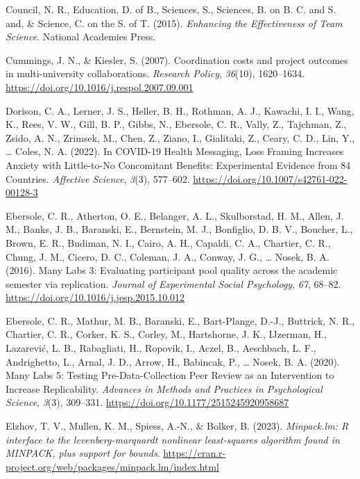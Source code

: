 \documentclass[
  man,floatsintext]{apa7}
\newlength{\cslhangindent}
\newenvironment{CSLReferences}[2] %
 {\begin{list}{}{%
  \setlength{\itemindent}{0pt}
  \setlength{\leftmargin}{0pt}
  \setlength{\parsep}{0pt}
  \ifodd #1
   \setlength{\leftmargin}{\cslhangindent}
   \setlength{\itemindent}{-1\cslhangindent}
  \fi
  \setlength{\itemsep}{#2\baselineskip}}}
 {\end{list}}
\begin{document}
\begin{CSLReferences}{1}{0}
Council, N. R., Education, D. of B., Sciences, S., Sciences, B. on B. C. and S. and, \& Science, C. on the S. of T. (2015). \emph{Enhancing the Effectiveness of Team Science}. National Academies Press.

Cummings, J. N., \& Kiesler, S. (2007). Coordination costs and project outcomes in multi-university collaborations. \emph{Research Policy}, \emph{36}(10), 1620--1634. \url{https://doi.org/10.1016/j.respol.2007.09.001}

Dorison, C. A., Lerner, J. S., Heller, B. H., Rothman, A. J., Kawachi, I. I., Wang, K., Rees, V. W., Gill, B. P., Gibbs, N., Ebersole, C. R., Vally, Z., Tajchman, Z., Zsido, A. N., Zrimsek, M., Chen, Z., Ziano, I., Gialitaki, Z., Ceary, C. D., Lin, Y., \ldots{} Coles, N. A. (2022). In {COVID}-19 {Health} {Messaging}, {Loss} {Framing} {Increases} {Anxiety} with {Little}-to-{No} {Concomitant} {Benefits}: {Experimental} {Evidence} from 84 {Countries}. \emph{Affective Science}, \emph{3}(3), 577--602. \url{https://doi.org/10.1007/s42761-022-00128-3}

Ebersole, C. R., Atherton, O. E., Belanger, A. L., Skulborstad, H. M., Allen, J. M., Banks, J. B., Baranski, E., Bernstein, M. J., Bonfiglio, D. B. V., Boucher, L., Brown, E. R., Budiman, N. I., Cairo, A. H., Capaldi, C. A., Chartier, C. R., Chung, J. M., Cicero, D. C., Coleman, J. A., Conway, J. G., \ldots{} Nosek, B. A. (2016). Many Labs 3: Evaluating participant pool quality across the academic semester via replication. \emph{Journal of Experimental Social Psychology}, \emph{67}, 68--82. \url{https://doi.org/10.1016/j.jesp.2015.10.012}

Ebersole, C. R., Mathur, M. B., Baranski, E., Bart-Plange, D.-J., Buttrick, N. R., Chartier, C. R., Corker, K. S., Corley, M., Hartshorne, J. K., IJzerman, H., Lazarević, L. B., Rabagliati, H., Ropovik, I., Aczel, B., Aeschbach, L. F., Andrighetto, L., Arnal, J. D., Arrow, H., Babincak, P., \ldots{} Nosek, B. A. (2020). Many Labs 5: Testing Pre-Data-Collection Peer Review as an Intervention to Increase Replicability. \emph{Advances in Methods and Practices in Psychological Science}, \emph{3}(3), 309--331. \url{https://doi.org/10.1177/2515245920958687}

Elzhov, T. V., Mullen, K. M., Spiess, A.-N., \& Bolker, B. (2023). \emph{Minpack.lm: R interface to the levenberg-marquardt nonlinear least-squares algorithm found in MINPACK, plus support for bounds}. \url{https://cran.r-project.org/web/packages/minpack.lm/index.html}


\end{CSLReferences}
\end{document}
